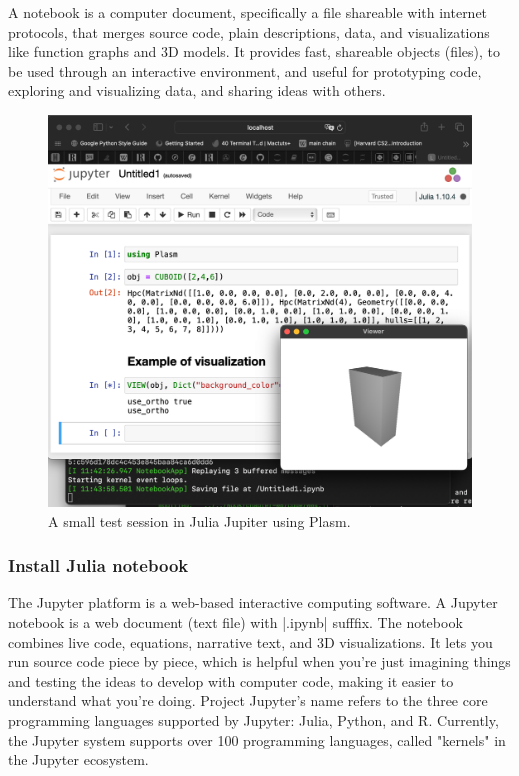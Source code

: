\begin{coding}
A notebook is a computer document, specifically a file shareable with internet protocols, that merges source code, plain descriptions, data, and visualizations like function graphs and 3D models. It provides fast, shareable objects (files), to be used through an interactive environment, and useful for prototyping code, exploring and visualizing data, and sharing ideas with others.




\begin{figure}[htbp] %
   \includegraphics[width=\linewidth]{chapter-04/figs/jupyter}%
\caption{A small test session in Julia Jupiter using Plasm.}
\label{fig:jupyter}
\end{figure}


\subsubsection*{Install Julia notebook}\label{sect:4-5-1}


The Jupyter platform is a web-based interactive computing software. 
A Jupyter notebook is a web document (text file) with |.ipynb| sufffix.
The notebook combines live code, equations, narrative text, and 3D visualizations. It lets you run source code piece by piece, which is helpful when you're just imagining things and testing the ideas to develop with computer code, making it easier to understand what you're doing.
Project Jupyter's name refers to the three core programming languages supported by Jupyter: Julia, Python, and R. Currently, the Jupyter system supports over 100 programming languages, called "kernels" in the Jupyter ecosystem.


\end{coding}
